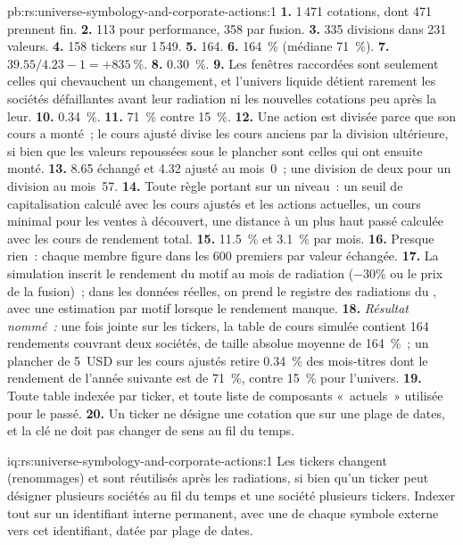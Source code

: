 \begin{solution}{pb:rs:universe-symbology-and-corporate-actions:1}
\textbf{1.} 1\,471 cotations, dont 471 prennent fin. \textbf{2.} 113 pour performance, 358 par fusion. \textbf{3.} 335 divisions dans 231 valeurs.
\textbf{4.} 158 tickers sur 1\,549. \textbf{5.} 164. \textbf{6.} 164~\% (médiane 71~\%). \textbf{7.} $39.55/4.23 - 1 = +835~\%$.
\textbf{8.} 0.30~\%. \textbf{9.} Les fenêtres raccordées sont seulement celles qui chevauchent un changement, et l'univers liquide détient rarement les
sociétés défaillantes avant leur radiation ni les nouvelles cotations peu après la leur. \textbf{10.} 0.34~\%. \textbf{11.} 71~\% contre
15~\%. \textbf{12.} Une action est divisée parce que son cours a monté~; le cours ajusté divise les cours anciens par la division ultérieure, si bien que les
valeurs repoussées sous le plancher sont celles qui ont ensuite monté. \textbf{13.} 8.65 échangé et 4.32 ajusté au mois~0~; une division de deux pour un
division au mois~57. \textbf{14.} Toute règle portant sur un niveau~: un seuil de capitalisation calculé avec les cours ajustés et les actions actuelles, un
cours minimal pour les ventes à découvert, une distance à un plus haut passé calculée avec les cours de rendement total. \textbf{15.} 11.5~\% et 3.1~\% par mois.
\textbf{16.} Presque rien~: chaque membre figure dans les 600 premiers par valeur échangée. \textbf{17.} La simulation inscrit le
rendement du motif au mois de radiation ($-30\%$ ou le prix de la fusion)~; dans les données réelles, on prend le registre des radiations du , avec une
estimation par motif lorsque le rendement manque. \textbf{18.} \emph{Résultat nommé~:} une fois jointe sur les tickers, la table de cours simulée
contient 164 rendements couvrant deux sociétés, de taille absolue moyenne de 164~\%~; un plancher de 5~USD sur les cours ajustés retire 0.34~\% des
mois-titres dont le rendement de l'année suivante est de 71~\%, contre 15~\% pour l'univers. \textbf{19.} Toute table indexée par ticker, et toute
liste de composants «~actuels~» utilisée pour le passé. \textbf{20.} Un ticker ne désigne une cotation que sur une plage de dates, et la clé ne doit pas
changer de sens au fil du temps.
\end{solution}

\begin{solution}{iq:rs:universe-symbology-and-corporate-actions:1}
Les tickers changent (renommages) et sont réutilisés après les radiations, si bien qu'un ticker peut désigner plusieurs sociétés au fil du temps et une société
plusieurs tickers. Indexer tout sur un identifiant interne permanent, avec une  de chaque symbole externe vers cet identifiant, datée par plage de dates.
\end{solution}

